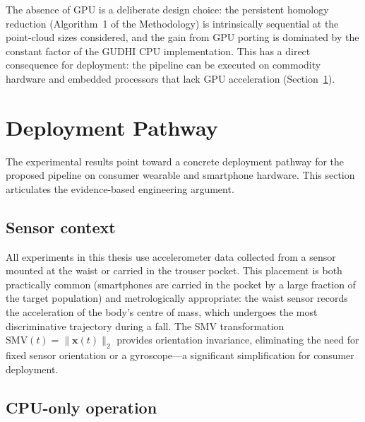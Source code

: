 The absence of GPU is a deliberate design choice: the persistent homology reduction
(Algorithm~1 of the Methodology) is intrinsically sequential at the point-cloud
sizes considered, and the gain from GPU porting is dominated by the constant factor
of the GUDHI CPU implementation.  This has a direct consequence for deployment:
the pipeline can be executed on commodity hardware and embedded processors that lack
GPU acceleration (Section~\ref{subsec:deployment}).

\section{Deployment Pathway}
\label{subsec:deployment}

The experimental results point toward a concrete deployment pathway for the proposed
pipeline on consumer wearable and smartphone hardware.  This section articulates the
evidence-based engineering argument.

\subsection{Sensor context}

All experiments in this thesis use accelerometer data collected from a sensor mounted
at the waist or carried in the trouser pocket.  This placement is both practically
common (smartphones are carried in the pocket by a large fraction of the target
population) and metrologically appropriate: the waist sensor records the acceleration
of the body's centre of mass, which undergoes the most discriminative trajectory
during a fall.  The SMV transformation $\mathrm{SMV}(t)=\|\mathbf{x}(t)\|_2$ provides
orientation invariance, eliminating the need for fixed sensor orientation or a
gyroscope---a significant simplification for consumer deployment.

\subsection{CPU-only operation}

